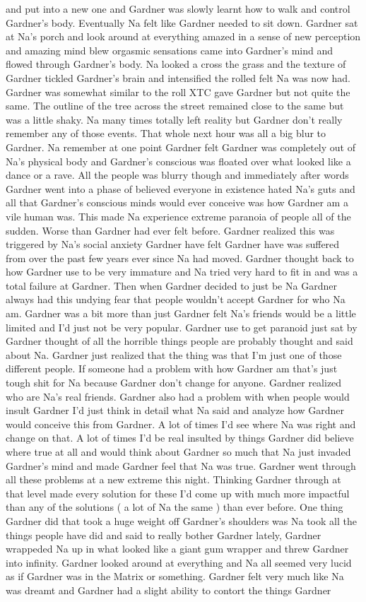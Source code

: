 \documentclass[12pt]{book}
\begin{document}
and put into a new one and Gardner was slowly learnt how to walk and control Gardner's body. Eventually Na felt like Gardner needed to sit down. Gardner sat at Na's porch and look around at everything amazed in a sense of new perception and amazing mind blew orgasmic sensations came into Gardner's mind and flowed through Gardner's body. Na looked a cross the grass and the texture of Gardner tickled Gardner's brain and intensified the rolled felt Na was now had. Gardner was somewhat similar to the roll XTC gave Gardner but not quite the same. The outline of the tree across the street remained close to the same but was a little shaky. Na many times totally left reality but Gardner don't really remember any of those events. That whole next hour was all a big blur to Gardner. Na remember at one point Gardner felt Gardner was completely out of Na's physical body and Gardner's conscious was floated over what looked like a dance or a rave. All the people was blurry though and immediately after words Gardner went into a phase of believed everyone in existence hated Na's guts and all that Gardner's conscious minds would ever conceive was how Gardner am a vile human was. This made Na experience extreme paranoia of people all of the sudden. Worse than Gardner had ever felt before. Gardner realized this was triggered by Na's social anxiety Gardner have felt Gardner have was suffered from over the past few years ever since Na had moved. Gardner thought back to how Gardner use to be very immature and Na tried very hard to fit in and was a total failure at Gardner. Then when Gardner decided to just be Na Gardner always had this undying fear that people wouldn't accept Gardner for who Na am. Gardner was a bit more than just Gardner felt Na's friends would be a little limited and I'd just not be very popular. Gardner use to get paranoid just sat by Gardner thought of all the horrible things people are probably thought and said about Na. Gardner just realized that the thing was that I'm just one of those different people. If someone had a problem with how Gardner am that's just tough shit for Na because Gardner don't change for anyone. Gardner realized who are Na's real friends. Gardner also had a problem with when people would insult Gardner I'd just think in detail what Na said and analyze how Gardner would conceive this from Gardner. A lot of times I'd see where Na was right and change on that. A lot of times I'd be real insulted by things Gardner did believe where true at all and would think about Gardner so much that Na just invaded Gardner's mind and made Gardner feel that Na was true. Gardner went through all these problems at a new extreme this night. Thinking Gardner through at that level made every solution for these I'd come up with much more impactful than any of the solutions ( a lot of Na the same ) than ever before. One thing Gardner did that took a huge weight off Gardner's shoulders was Na took all the things people have did and said to really bother Gardner lately, Gardner wrappeded Na up in what looked like a giant gum wrapper and threw Gardner into infinity. Gardner looked around at everything and Na all seemed very lucid as if Gardner was in the Matrix or something. Gardner felt very much like Na was dreamt and Gardner had a slight ability to contort the things Gardner 
\end{document}

